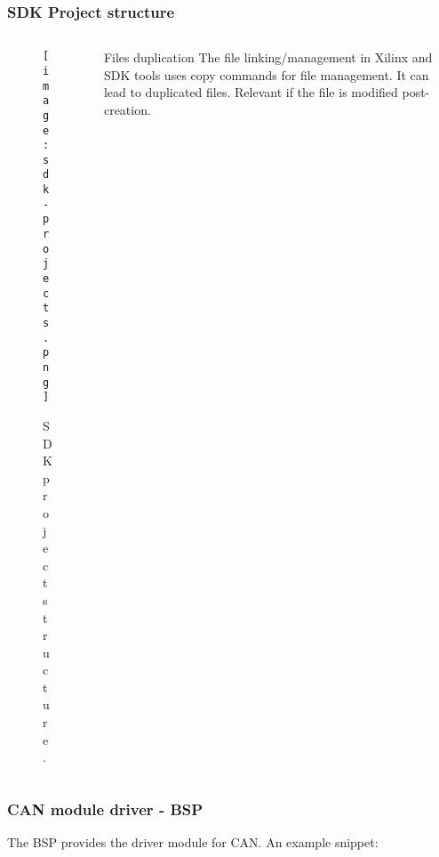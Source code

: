 \begin{frame}
	\frametitle{SDK Project structure}
	\begin{columns}
		\begin{column}{0.25\textwidth}
			\begin{figure}
				\texttt{[image: sdk-projects.png]}
				\caption{SDK project structure.}\label{fig:sdk-projects}
			\end{figure}
		\end{column}
		\begin{column}{0.6\textwidth}
			\begin{alertblock}{Files duplication}
				The file linking/management in Xilinx and SDK tools uses copy commands for file management. It can lead to duplicated files. Relevant if the file is modified post-creation.
			\end{alertblock}
		\end{column}
	\end{columns}
\end{frame}

\begin{frame}
	\frametitle{CAN module driver - BSP}
	The BSP provides the driver module for CAN. An example snippet:
	\vfill
	
\end{frame}
